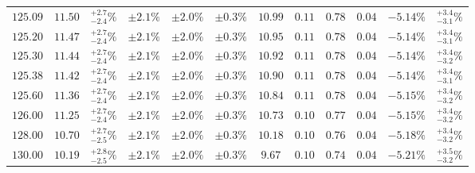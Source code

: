 \begin{landscape}
\begin{table}[ht!]
{\begin{tabular}{| cc | c | ccc | ccccc | c |}
$125.09$ & $11.50$ & $^{+2.7}_{-2.4}\%$ & $\pm 2.1\%$ & {\color{black!55}$\pm 2.0\%$} & {\color{black!55}$\pm 0.3\%$} & $10.99$ & $0.11$ & $0.78$ & $0.04$ & $-5.14\%$ & $^{+3.4}_{-3.1}\%$ \\
$125.20$ & $11.47$ & $^{+2.7}_{-2.4}\%$ & $\pm 2.1\%$ & {\color{black!55}$\pm 2.0\%$} & {\color{black!55}$\pm 0.3\%$} & $10.95$ & $0.11$ & $0.78$ & $0.04$ & $-5.14\%$ & $^{+3.4}_{-3.1}\%$ \\
$125.30$ & $11.44$ & $^{+2.7}_{-2.4}\%$ & $\pm 2.1\%$ & {\color{black!55}$\pm 2.0\%$} & {\color{black!55}$\pm 0.3\%$} & $10.92$ & $0.11$ & $0.78$ & $0.04$ & $-5.14\%$ & $^{+3.4}_{-3.2}\%$ \\
$125.38$ & $11.42$ & $^{+2.7}_{-2.4}\%$ & $\pm 2.1\%$ & {\color{black!55}$\pm 2.0\%$} & {\color{black!55}$\pm 0.3\%$} & $10.90$ & $0.11$ & $0.78$ & $0.04$ & $-5.14\%$ & $^{+3.4}_{-3.1}\%$ \\
$125.60$ & $11.36$ & $^{+2.7}_{-2.4}\%$ & $\pm 2.1\%$ & {\color{black!55}$\pm 2.0\%$} & {\color{black!55}$\pm 0.3\%$} & $10.84$ & $0.11$ & $0.78$ & $0.04$ & $-5.15\%$ & $^{+3.4}_{-3.2}\%$ \\
$126.00$ & $11.25$ & $^{+2.7}_{-2.4}\%$ & $\pm 2.1\%$ & {\color{black!55}$\pm 2.0\%$} & {\color{black!55}$\pm 0.3\%$} & $10.73$ & $0.10$ & $0.77$ & $0.04$ & $-5.15\%$ & $^{+3.4}_{-3.2}\%$ \\
$128.00$ & $10.70$ & $^{+2.7}_{-2.5}\%$ & $\pm 2.1\%$ & {\color{black!55}$\pm 2.0\%$} & {\color{black!55}$\pm 0.3\%$} & $10.18$ & $0.10$ & $0.76$ & $0.04$ & $-5.18\%$ & $^{+3.4}_{-3.2}\%$ \\
$130.00$ & $10.19$ & $^{+2.8}_{-2.5}\%$ & $\pm 2.1\%$ & {\color{black!55}$\pm 2.0\%$} & {\color{black!55}$\pm 0.3\%$} & $9.67$ & $0.10$ & $0.74$ & $0.04$ & $-5.21\%$ & $^{+3.5}_{-3.2}\%$ \\
\cline{1-12}
\end{tabular}
}
\end{table}


\end{landscape}
